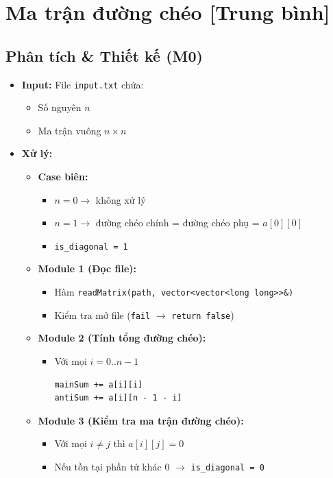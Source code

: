\section{Ma trận đường chéo [Trung bình]}
\subsection{Phân tích \& Thiết kế (M0)}
\begin{itemize}
    \item \textbf{Input:}
    File \texttt{input.txt} chứa:
    \begin{itemize}
        \item Số nguyên $n$
        \item Ma trận vuông $n \times n$
    \end{itemize}

    \item \textbf{Xử lý:}
    \begin{itemize}
        \item \textbf{Case biên:}
        \begin{itemize}
            \item $n = 0 \rightarrow$ không xử lý
            \item $n = 1 \rightarrow$ đường chéo chính = đường chéo phụ = $a[0][0]$
            \item \texttt{is\_diagonal = 1}
        \end{itemize}

        \item \textbf{Module 1 (Đọc file):}
        \begin{itemize}
            \item Hàm \texttt{readMatrix(path, vector<vector<long long>>\&)}
            \item Kiểm tra mở file (\texttt{fail} $\rightarrow$ \texttt{return false})
        \end{itemize}

        \item \textbf{Module 2 (Tính tổng đường chéo):}
        \begin{itemize}
            \item Với mọi $i = 0..n-1$
            \begin{lstlisting}
mainSum += a[i][i]
antiSum += a[i][n - 1 - i]
            \end{lstlisting}
        \end{itemize}

        \item \textbf{Module 3 (Kiểm tra ma trận đường chéo):}
        \begin{itemize}
            \item Với mọi $i \ne j$ thì $a[i][j] = 0$
            \item Nếu tồn tại phần tử khác 0 $\rightarrow$ \texttt{is\_diagonal = 0}
        \end{itemize}
    \end{itemize}


\end{itemize}

